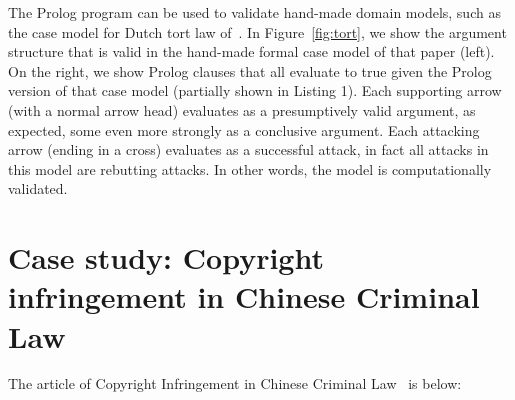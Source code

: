 \documentclass{IOS-Book-Article}
\begin{document}
The Prolog program can be used to validate hand-made domain models, such as the case model for Dutch tort law of~\cite{Verheij2017Formalizing}. In Figure~\ref{fig:tort}, we show the argument structure that is valid in the hand-made formal case model of that paper (left). On the right, we show Prolog clauses that all evaluate to true given the Prolog version of that case model (partially shown in Listing 1). Each supporting arrow (with a normal arrow head) evaluates as a presumptively valid argument, as expected, some even more strongly as a conclusive argument. Each attacking arrow (ending in a cross) evaluates as a successful attack, in fact all attacks in this model are rebutting attacks. In other words, the model is computationally validated.

\begin{figure*}[btp]
	\scalebox{0.7}{}
\caption{The Dutch tort law model: argument structure (left); in Prolog (right)}
\label{fig:tort}
\end{figure*}


\section{Case study: Copyright infringement in Chinese Criminal Law}




\noindent The article of Copyright Infringement in Chinese Criminal Law~\cite{StateCouncil2015series} is below:
\newline
\end{document}
